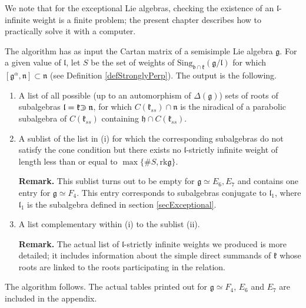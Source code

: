 \documentclass[12pt]{report}
\newcommand{\kk}{\mathfrak{k}}
\newcommand{\nn}{\mathfrak{n}}
\newcommand{\hh}{\mathfrak{h}}
\newcommand{\gG}{\mathfrak{g}}
\newcommand{\bb}{\mathfrak{b}}
\newcommand{\lL}{\mathfrak{l}}
\newcommand{\hw}{\mathrm{Sing}}
\newcommand{\rk}{\mathrm{rk}}
\def\crplus{\hbox{$\supset${\raise1.05pt\hbox{\kern -0.60em ${\scriptscriptstyle +}$}}\ }}
\newcommand{\arxivVersion}[1]{#1}
\begin{document}
We note that for the exceptional Lie algebras, checking the existence of an $\lL$-infinite weight is a finite problem; the present chapter describes how to practically solve it with a computer.

The algorithm has as input the Cartan matrix of a semisimple Lie algebra $\gG$. For a given value of $\lL$, let $S$ be the set of weights of $\hw_{\bb\cap\kk}(\gG/\lL)$ for which $[\gG^{\alpha}, \nn]\subset\nn$ (see Definition \ref{defStronglyPerp}). The output is the following.
\begin{enumerate}
\item[(i)] A list of all possible (up to an automorphism of $\Delta(\gG)$) sets of roots of subalgebras $\lL=\kk\crplus\nn$, for which $C(\kk_{ss})\cap\nn$ is the niradical of a parabolic subalgebra of $C(\kk_{ss})$ containing $\hh\cap C(\kk_{ss})$.
\item[(ii)] A sublist of the list in (i) for which the corresponding subalgebras do not satisfy the cone condition but there exists no $\lL$-strictly infinite weight of length less than or equal to $\max\{\# S, \rk\gG\}$.

\textbf{Remark.} This sublist turns out to be empty for $\gG\simeq E_6, E_7$ and contains one entry for $\gG\simeq F_4$. This entry corresponds to subalgebras conjugate to $\lL_1$, where $\lL_1$ is the subalgebra defined in section \ref{secExceptional}.
\item[(iii)] A list complementary within (i) to the sublist (ii).

\arxivVersion{\textbf{Remark.} The actual list of $\lL$-strictly infinite weights we produced is more detailed; it includes information about the simple direct summands of $\kk$ whose roots are linked to the roots participating in the relation. %
}
\end{enumerate}
The algorithm follows. \arxivVersion{The actual tables printed out for $\gG\simeq F_4$, $E_6$ and $E_7$ are included in the appendix.}
\end{document}
